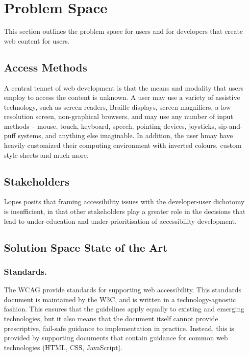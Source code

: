 \section{Problem Space} %
\label{sec:problem_space}

This section outlines the problem space for users and for developers that create web content for users.

\subsection{Access Methods} %
\label{sub:access_methods}

A central tennet of web development is that the means and modality that users employ to access the content is unknown. A user may use a variety of assistive technology, such as screen readers, Braille displays, screen magnifiers, a low-resolution screen, non-graphical browsers, and may use any number of input methods -- mouse, touch, keyboard, speech, pointing devices, joysticks, sip-and-puff systems, and anything else imaginable. In addition, the user hmay have heavily customized their computing environment with inverted colours, custom style sheets and much more. 



\subsection{Stakeholders} %
\label{sub:stakeholders}

Lopes \cite{Lopes:2010} posits that framing accessibility issues with the developer-user dichotomy is insufficient, in that other stakeholders play a greater role in the decisions that lead to under-education and under-prioritisation of accessibility development.

\subsection{Solution Space State of the Art} %
\label{sub:state_of_the_art}

\subsubsection{Standards.} %
	\label{ssub:standards_}
	The \ac{WCAG} \cite{wcag:2008} provide standards for supporting web accessibility. This standards document is maintained by the \ac{W3C}, and is written in a technology-agnostic fashion. This ensures that the guidelines apply equally to existing and emerging technologies, but it also means that the document itself cannot provide prescriptive, fail-safe guidance to implementation in practice. Instead, this is provided by supporting documents that contain guidance for common web technologies (HTML, CSS, JavaScript).	

